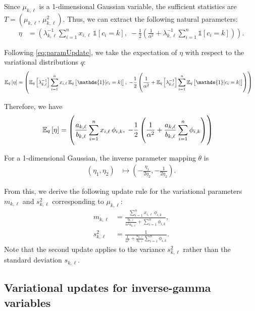 \documentclass[11pt]{article}
\begin{document}
Since $\mu_{k,\ell}$ is a 1-dimensional Gaussian variable, the sufficient statistics are $T = (\mu_{k,\ell}, \, \mu_{k,\ell}^2)$.
Thus, we can extract the following natural parameters:
\begin{align}
\eta &= \left(
    \lambda_{k,\ell}^{-1} \sum_{i=1}^n x_{i,\ell} \, \mathds{1}[c_i=k], \;
    -\frac{1}{2} \left( \frac{1}{\alpha^2} + \lambda_{k,\ell}^{-1} \sum_{i=1}^n \mathds{1}[c_i=k] \right)
\right).
\end{align}

Following \eqref{eq:paramUpdate}, we take the expectation of $\eta$ with respect to the variational distributions $q$:
\begin{align}
\expectOver{q}{\eta}
&=
\left(
    \expectOver{q}{\lambda_{k,\ell}^{-1}} \sum_{i=1}^n x_{i,\ell} \, \expectOver{q}{\mathds{1}[c_i=k]}, \;
    -\frac{1}{2} \left( \frac{1}{\alpha^2} + \expectOver{q}{\lambda_{k,\ell}^{-1}} \sum_{i=1}^n \expectOver{q}{\mathds{1}[c_i=k]} \right)
\right)
\end{align}

Therefore, we have
\begin{align}
\mathbb{E}_{\substack{q}}\left[ \eta \right]
&=
\left(
    \frac{a_{k,\ell}}{b_{k,\ell}} \sum_{i=1}^n x_{i,\ell} \, \phi_{i,k}, \;
    -\frac{1}{2} \left( \frac{1}{\alpha^2} + \frac{a_{k,\ell}}{b_{k,\ell}} \sum_{i=1}^n \phi_{i,k} \right)
\right)
\end{align}

For a 1-dimensional Gaussian, the inverse parameter mapping $\theta$ is
\begin{align}
(\eta_1, \eta_2)
&\mapsto
\left( -\frac{\eta_1}{2 \eta_2}, -\frac{1}{2 \eta_2} \right).
\end{align}

From this, we derive the following update rule for the variational parameters $m_{k,\ell}$ and $s_{k,\ell}^2$ corresponding to $\mu_{k,\ell}$:
\begin{align}
\label{eq:exVarUpdateM}
m_{k,\ell} &= \frac{ \sum_{i=1}^n x_{i,\ell} \, \phi_{i,k} }
                   { \frac{b_{k,\ell}}{\alpha^2 a_{k,\ell}} + \sum_{i=1}^n \phi_{i,k} }, \\
\label{eq:exVarUpdateS}
s_{k,\ell}^2 &= \frac{ 1 }
                   { \frac{1}{\alpha^2} + \frac{a_{k,\ell}}{b_{k,\ell}} \sum_{i=1}^n \phi_{i,k} }.
\end{align}
Note that the second update applies to the variance $s_{k,\ell}^2$ rather than the standard deviation $s_{k,\ell}$.

\subsection{Variational updates for inverse-gamma variables}
\end{document}

